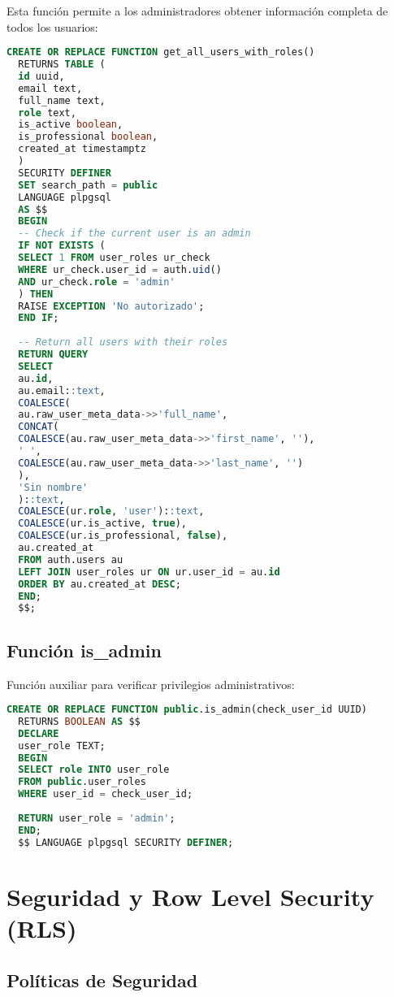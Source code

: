 \documentclass[12pt,a4paper]{article}
\begin{document}
Esta función permite a los administradores obtener información completa de todos los usuarios:

\begin{lstlisting}[language=SQL, caption=Función get\_all\_users\_with\_roles]
  CREATE OR REPLACE FUNCTION get_all_users_with_roles()
  RETURNS TABLE (
  id uuid,
  email text,
  full_name text,
  role text,
  is_active boolean,
  is_professional boolean,
  created_at timestamptz
  )
  SECURITY DEFINER
  SET search_path = public
  LANGUAGE plpgsql
  AS $$
  BEGIN
  -- Check if the current user is an admin
  IF NOT EXISTS (
  SELECT 1 FROM user_roles ur_check
  WHERE ur_check.user_id = auth.uid() 
  AND ur_check.role = 'admin'
  ) THEN
  RAISE EXCEPTION 'No autorizado';
  END IF;
  
  -- Return all users with their roles
  RETURN QUERY
  SELECT 
  au.id,
  au.email::text,
  COALESCE(
  au.raw_user_meta_data->>'full_name',
  CONCAT(
  COALESCE(au.raw_user_meta_data->>'first_name', ''),
  ' ',
  COALESCE(au.raw_user_meta_data->>'last_name', '')
  ),
  'Sin nombre'
  )::text,
  COALESCE(ur.role, 'user')::text,
  COALESCE(ur.is_active, true),
  COALESCE(ur.is_professional, false),
  au.created_at
  FROM auth.users au
  LEFT JOIN user_roles ur ON ur.user_id = au.id
  ORDER BY au.created_at DESC;
  END;
  $$;
\end{lstlisting}

\subsection{Función is\_admin}

Función auxiliar para verificar privilegios administrativos:

\begin{lstlisting}[language=SQL, caption=Función is\_admin]
  CREATE OR REPLACE FUNCTION public.is_admin(check_user_id UUID)
  RETURNS BOOLEAN AS $$
  DECLARE
  user_role TEXT;
  BEGIN
  SELECT role INTO user_role
  FROM public.user_roles
  WHERE user_id = check_user_id;
  
  RETURN user_role = 'admin';
  END;
  $$ LANGUAGE plpgsql SECURITY DEFINER;
\end{lstlisting}

\section{Seguridad y Row Level Security (RLS)}

\subsection{Políticas de Seguridad}
\end{document}

